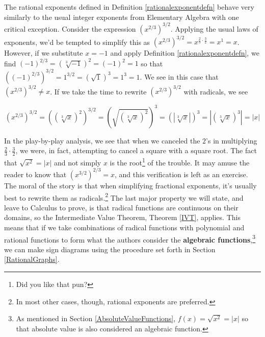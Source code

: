 \smallskip

The rational exponents defined in Definition \ref{rationalexponentdefn} behave very similarly to the usual integer exponents from Elementary Algebra with one critical exception.  Consider the expression $\left(x^{2/3}\right)^{3/2}$.  Applying the usual laws of exponents, we'd be tempted to simplify this as $\left(x^{2/3}\right)^{3/2} = x^{\frac{2}{3} \cdot \frac{3}{2}} = x^{1} = x$.  However, if we substitute $x=-1$ and apply Definition \ref{rationalexponentdefn}, we find $(-1)^{2/3} = \left(\sqrt[3]{-1}\right)^2 = (-1)^2 = 1$ so that $\left((-1)^{2/3}\right)^{3/2} = 1^{3/2} = \left(\sqrt{1}\right)^3 = 1^3 = 1$.  We see in this case that $\left(x^{2/3}\right)^{3/2} \neq x$.  If we take the time to rewrite $\left(x^{2/3}\right)^{3/2}$ with radicals, we see 

\[ \left(x^{2/3}\right)^{3/2} = \left(\left(\sqrt[3]{x}\right)^2\right)^{3/2} =  \left(\sqrt{\left(\sqrt[3]{x}\right)^2}\right)^3 =\left(\left|\sqrt[3]{x}\right|\right)^3 = \left| \left(\sqrt[3]{x}\right)^3  \right| = |x|\]

In the play-by-play analysis, we see that when we canceled the $2$'s in multiplying $\frac{2}{3} \cdot \frac{3}{2}$, we were, in fact, attempting to cancel a square with a square root.  The fact that $\sqrt{x^2} = |x|$ and not simply $x$ is the root\footnote{Did you like that pun?} of the trouble.  It may amuse the reader to know that  $\left(x^{3/2}\right)^{2/3} = x$, and this verification is left as an exercise.  The moral of the story is that when simplifying fractional exponents, it's usually best to rewrite them as radicals.\footnote{In most other cases, though, rational exponents are preferred.}   The last major property we will state, and leave to Calculus to prove, is that radical functions are continuous on their domains, so the Intermediate Value Theorem, Theorem \ref{IVT}, applies.  This means that if we take combinations of radical functions with polynomial and rational functions to form what the authors consider  the \textbf{algebraic functions},\footnote{As mentioned in Section \ref{AbsoluteValueFunctions}, $f(x) = \sqrt{x^2}=|x|$ so that absolute value is also considered an algebraic function.} we can make sign diagrams using the procedure set forth in Section \ref{RationalGraphs}.  

\medskip

\label{algebraicsigndiagram}

